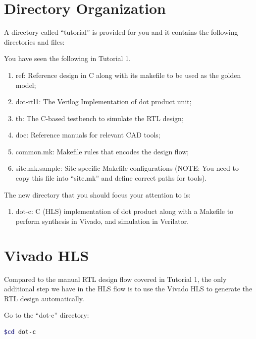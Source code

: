 \documentclass[12pt]{article}
\begin{document}
\section{Directory Organization}

A directory called “tutorial” is provided for you and it contains the
following directories and files:

You have seen the following in Tutorial 1.

\begin{enumerate}

\item ref: Reference design in C along with its makefile to be used
    as the golden model;

\item dot-rtl1: The Verilog Implementation of dot product unit;

\item tb: The C-based testbench to simulate the RTL design;

\item doc: Reference manuals for relevant CAD tools;

\item common.mk: Makefile rules that encodes the design flow;

\item site.mk.sample: Site-specific Makefile configurations (NOTE: You
  need to copy this file into “site.mk” and define correct paths for
  tools).

\end{enumerate}

The new directory that you should focus your attention to is:

\begin{enumerate}
\item dot-c: C (HLS) implementation of dot product along with a
  Makefile to perform synthesis in Vivado, and simulation in
  Verilator.
\end{enumerate}

\section{Vivado HLS}

Compared to the manual RTL design flow covered in Tutorial 1,
the only additional step we have in the HLS flow is to use
the Vivado HLS to generate the RTL design automatically.

Go to the “dot-c” directory:

\begin{lstlisting}[language=bash]
  $cd dot-c
\end{lstlisting}
\end{document}
